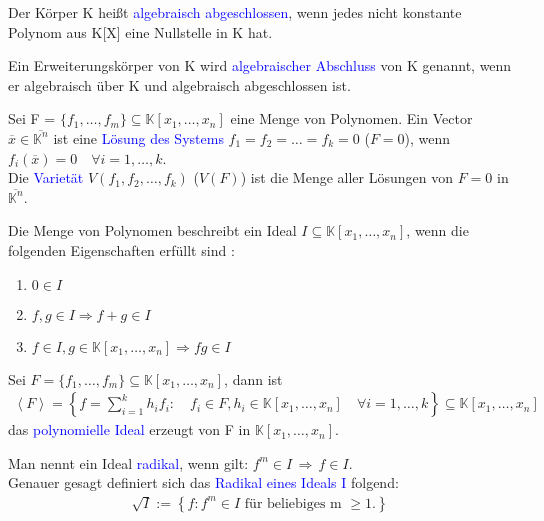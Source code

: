 \begin{definition}
Der Körper K heißt \textcolor{blue}{algebraisch abgeschlossen}, wenn jedes nicht konstante Polynom aus K[X] eine Nullstelle in K hat. \cite{Karpfinger}
\end{definition}

\begin{definition}
Ein Erweiterungskörper von K wird \textcolor{blue}{algebraischer Abschluss} von K genannt, wenn er algebraisch über K und algebraisch abgeschlossen ist. \cite{Karpfinger}
\end{definition}

\begin{definition}
Sei F = $\{f_1,\ldots,f_m\} \subseteq \mathbb{K}[x_1,\ldots,x_n]$ eine Menge von Polynomen. Ein Vector $\overline{x} \in \overline{\mathbb{K}^n}$ ist eine \textcolor{blue}{Lösung des Systems} $f_1 = f_2 = \ldots = f_k=0$ ($F = 0$), wenn $f_i(\overline{x})=0 \quad \forall i=1,\dots,k$.\\
Die \textcolor{blue}{Varietät} $V(f_1,f_2,\ldots,f_k)$ ($V(F)$) ist die Menge aller Lösungen von $F=0$ in $\overline{\mathbb{K}^n}$.\cite{Ausgangsartikel}
\end{definition}

\begin{definition}
Die Menge von Polynomen beschreibt ein Ideal $I \subseteq \mathbb{K}[x_1,\ldots,x_n]$, wenn die folgenden Eigenschaften erfüllt sind \cite{Ausgangsartikel}:
\begin{enumerate}
\item $0 \in I$
\item $f,g \in I \Rightarrow f+g \in I$
\item $f \in I, g \in \mathbb{K}[x_1,\ldots,x_n] \Rightarrow fg \in I$
\end{enumerate}
Sei $F = \{f_1,\ldots,f_m\} \subseteq \mathbb{K}[x_1,\ldots,x_n]$, dann ist
\begin{align*}
\left\langle F \right\rangle = \left\{f = \sum_{i=1}^k h_if_i: \quad f_i \in F, h_i \in \mathbb{K}[x_1,\ldots,x_n] \quad \forall i = 1,\ldots,k\right\} \subseteq \mathbb{K}[x_1,\ldots,x_n]
\end{align*}
das \textcolor{blue}{polynomielle Ideal} erzeugt von F in $\mathbb{K}[x_1,\ldots,x_n]$.
\end{definition}


\begin{definition} \label{Radikal}
Man nennt ein Ideal \textcolor{blue}{radikal}, wenn gilt: $f^m \in I \, \Rightarrow \, f \in I$. \\
Genauer gesagt definiert sich das \textcolor{blue}{Radikal eines Ideals I} folgend: 
\begin{align*}
\sqrt{I} := \left\{f: f^m \in  I \text{ für beliebiges m } \ge 1.\right\}
\end{align*}
\end{definition}

